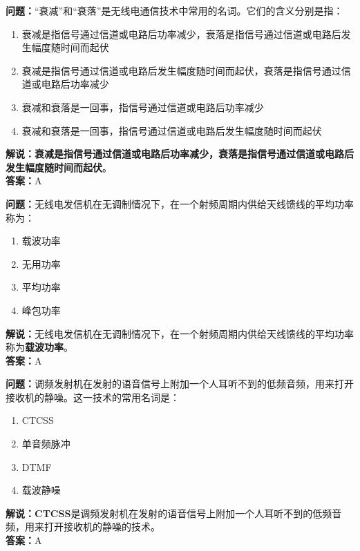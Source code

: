 \textbf{问题：}“衰减”和“衰落”是无线电通信技术中常用的名词。它们的含义分别是指：

\begin{enumerate}[label=\Alph*), leftmargin=1.5cm]
	\item 衰减是指信号通过信道或电路后功率减少，衰落是指信号通过信道或电路后发生幅度随时间而起伏
	\item 衰减是指信号通过信道或电路后发生幅度随时间而起伏，衰落是指信号通过信道或电路后功率减少
	\item 衰减和衰落是一回事，指信号通过信道或电路后功率减少
	\item 衰减和衰落是一回事，指信号通过信道或电路后发生幅度随时间而起伏
\end{enumerate}

\textbf{解说：}\textbf{衰减是指信号通过信道或电路后功率减少，衰落是指信号通过信道或电路后发生幅度随时间而起伏}。\\\textbf{答案：}A%



\textbf{问题：}无线电发信机在无调制情况下，在一个射频周期内供给天线馈线的平均功率称为：

\begin{enumerate}[label=\Alph*), leftmargin=1.5cm]
	\item 载波功率
	\item 无用功率
	\item 平均功率
	\item 峰包功率
\end{enumerate}

\textbf{解说：}无线电发信机在无调制情况下，在一个射频周期内供给天线馈线的平均功率称为\textbf{载波功率}。\\\textbf{答案：}A%



\textbf{问题：}调频发射机在发射的语音信号上附加一个人耳听不到的低频音频，用来打开接收机的静噪。这一技术的常用名词是：

\begin{enumerate}[label=\Alph*), leftmargin=1.5cm]
	\item CTCSS
	\item 单音频脉冲
	\item DTMF
	\item 载波静噪
\end{enumerate}

\textbf{解说：}\textbf{CTCSS}是调频发射机在发射的语音信号上附加一个人耳听不到的低频音频，用来打开接收机的静噪的技术。\\\textbf{答案：}A%



